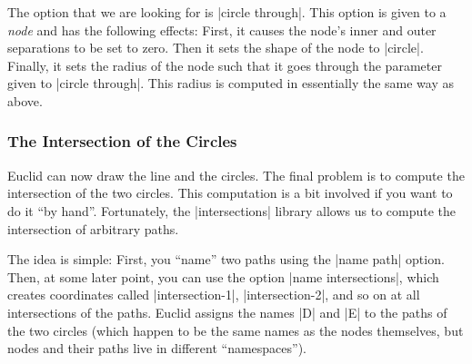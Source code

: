 The option that we are looking for is |circle through|. This option is given to
a \emph{node} and has the following effects: First, it causes the node's inner
and outer separations to be set to zero. Then it sets the shape of the node to
|circle|. Finally, it sets the radius of the node such that it goes through the
parameter given to |circle through|. This radius is computed in essentially the
same way as above.
%
\begin{codeexample}[preamble={\usetikzlibrary{through}}]
\end{codeexample}


\subsubsection{The Intersection of the Circles}

Euclid can now draw the line and the circles. The final problem is to compute
the intersection of the two circles. This computation is a bit involved if you
want to do it ``by hand''. Fortunately, the |intersections| library allows us
to compute the intersection of arbitrary paths.

The idea is simple: First, you ``name'' two paths using the |name path| option.
Then, at some later point, you can use the option |name intersections|, which
creates coordinates called |intersection-1|, |intersection-2|, and so on at all
intersections of the paths. Euclid assigns the names |D| and |E| to the paths
of the two circles (which happen to be the same names as the nodes themselves,
but nodes and their paths live in different ``namespaces'').
%
\begin{codeexample}[preamble={\usetikzlibrary{intersections,through}}]
\end{codeexample}

